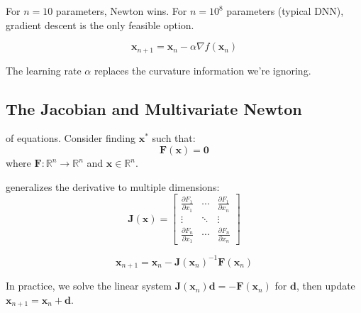 \vspace{1em}
For $n = 10$ parameters, Newton wins. For $n = 10^8$ parameters (typical DNN), gradient descent is the only feasible option.

\begin{equation}
    \mathbf{x}_{n+1} = \mathbf{x}_n - \alpha \nabla f(\mathbf{x}_n)
\end{equation}

The learning rate $\alpha$ replaces the curvature information we're ignoring.


\subsection{The Jacobian and Multivariate Newton}

 of equations. Consider finding $\mathbf{x}^*$ such that:
\begin{equation}
    \mathbf{F}(\mathbf{x}) = \mathbf{0}
\end{equation}
where $\mathbf{F}: \mathbb{R}^n \to \mathbb{R}^n$ and $\mathbf{x} \in \mathbb{R}^n$.


 generalizes the derivative to multiple dimensions:
\begin{equation}
    \mathbf{J}(\mathbf{x}) = \begin{bmatrix}
        \frac{\partial F_1}{\partial x_1} & \cdots & \frac{\partial F_1}{\partial x_n} \\
        \vdots & \ddots & \vdots \\
        \frac{\partial F_n}{\partial x_1} & \cdots & \frac{\partial F_n}{\partial x_n}
    \end{bmatrix}
\end{equation}

\begin{equation}
    \mathbf{x}_{n+1} = \mathbf{x}_n - \mathbf{J}(\mathbf{x}_n)^{-1} \mathbf{F}(\mathbf{x}_n)
\end{equation}

In practice, we solve the linear system $\mathbf{J}(\mathbf{x}_n) \mathbf{d} = -\mathbf{F}(\mathbf{x}_n)$ for $\mathbf{d}$, then update
$\mathbf{x}_{n+1} = \mathbf{x}_n + \mathbf{d}$.

